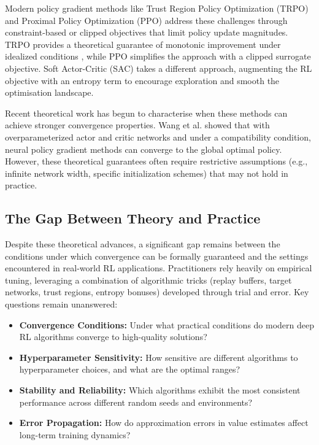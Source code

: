 \documentclass[12pt,a4paper]{report}
\begin{document}
Modern policy gradient methods like Trust Region Policy Optimization (TRPO) \cite{schulman2017trpo} and Proximal Policy Optimization (PPO) \cite{schulman2017ppo} address these challenges through constraint-based or clipped objectives that limit policy update magnitudes. TRPO provides a theoretical guarantee of monotonic improvement under idealized conditions \cite{schulman2017trpo}, while PPO simplifies the approach with a clipped surrogate objective. Soft Actor-Critic (SAC) \cite{haarnoja2018sac} takes a different approach, augmenting the RL objective with an entropy term to encourage exploration and smooth the optimisation landscape.

Recent theoretical work has begun to characterise when these methods can achieve stronger convergence properties. Wang et al. \cite{wang2019neural} showed that with overparameterized actor and critic networks and under a compatibility condition, neural policy gradient methods can converge to the global optimal policy. However, these theoretical guarantees often require restrictive assumptions (e.g., infinite network width, specific initialization schemes) that may not hold in practice.

\subsection{The Gap Between Theory and Practice}

Despite these theoretical advances, a significant gap remains between the conditions under which convergence can be formally guaranteed and the settings encountered in real-world RL applications. Practitioners rely heavily on empirical tuning, leveraging a combination of algorithmic tricks (replay buffers, target networks, trust regions, entropy bonuses) developed through trial and error. Key questions remain unanswered:

\begin{itemize}
    \item \textbf{Convergence Conditions:} Under what practical conditions do modern deep RL algorithms converge to high-quality solutions?
    \item \textbf{Hyperparameter Sensitivity:} How sensitive are different algorithms to hyperparameter choices, and what are the optimal ranges?
    \item \textbf{Stability and Reliability:} Which algorithms exhibit the most consistent performance across different random seeds and environments?
    \item \textbf{Error Propagation:} How do approximation errors in value estimates affect long-term training dynamics?
\end{itemize}
\end{document}
